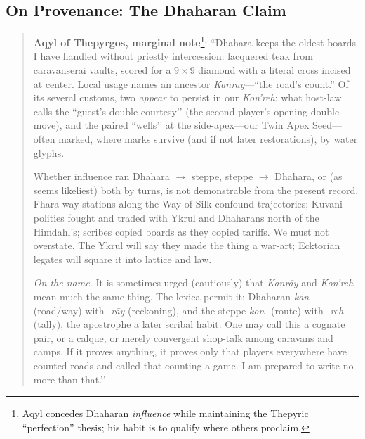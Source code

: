 \documentclass[11pt]{article}
\begin{document}
\subsection*{On Provenance: The Dhaharan Claim}
\begin{quote}\small
\textbf{Aqyl of Thepyrgos, marginal note}\footnote{Aqyl concedes Dhaharan \emph{influence} while maintaining the Thepyric “perfection” thesis; his habit is to qualify where others proclaim.}:
``Dhahara keeps the oldest boards I have handled without priestly intercession: lacquered teak from caravanserai vaults, scored for a $9\times9$ diamond with a literal cross incised at center. Local usage names an ancestor \emph{Kanrāy}—``the road’s count.'' Of its several customs, two \emph{appear} to persist in our \emph{Kon'reh}: what host-law calls the ``guest’s double courtesy’’ (the second player’s opening double-move), and the paired ``wells’’ at the side-apex—our Twin Apex Seed—often marked, where marks survive (and if not later restorations), by water glyphs.

Whether influence ran Dhahara $\rightarrow$ steppe, steppe $\rightarrow$ Dhahara, or (as seems likeliest) both by turns, is not demonstrable from the present record. Fhara way-stations along the Way of Silk confound trajectories; Kuvani polities fought and traded with Ykrul and Dhaharans north of the Himdahl’s; scribes copied boards as they copied tariffs. We must not overstate. The Ykrul will say they made the thing a war-art; Ecktorian legates will square it into lattice and law.

\emph{On the name.} It is sometimes urged (cautiously) that \emph{Kanrāy} and \emph{Kon'reh} mean much the same thing. The lexica permit it: Dhaharan \emph{kan-} (road/way) with \emph{-rāy} (reckoning), and the steppe \emph{kon-} (route) with \emph{-reh} (tally), the apostrophe a later scribal habit. One may call this a cognate pair, or a calque, or merely convergent shop-talk among caravans and camps. If it proves anything, it proves only that players everywhere have counted roads and called that counting a game. I am prepared to write no more than that.’’
\end{quote}
\end{document}
